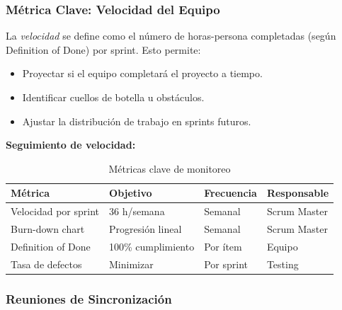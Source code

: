 \documentclass{article}
\begin{document}
\subsubsection{Métrica Clave: Velocidad del Equipo}

La \textit{velocidad} se define como el número de horas-persona completadas (según Definition of Done) por sprint. Esto permite:

\begin{itemize}
    \item Proyectar si el equipo completará el proyecto a tiempo.
    \item Identificar cuellos de botella u obstáculos.
    \item Ajustar la distribución de trabajo en sprints futuros.
\end{itemize}

\textbf{Seguimiento de velocidad:}

\begin{table}[H]
\centering
\small
\begin{tabular}{|p{3.5cm}|p{2.5cm}|p{2cm}|p{2cm}|}
\hline
\textbf{Métrica} & \textbf{Objetivo} & \textbf{Frecuencia} & \textbf{Responsable} \\
\hline
Velocidad por sprint & 36 h/semana & Semanal & Scrum Master \\
\hline
Burn-down chart & Progresión lineal & Semanal & Scrum Master \\
\hline
Definition of Done & 100\% cumplimiento & Por ítem & Equipo \\
\hline
Tasa de defectos & Minimizar & Por sprint & Testing \\
\hline
\end{tabular}
\caption{Métricas clave de monitoreo}
\label{tab:metricas}
\end{table}

\subsubsection{Reuniones de Sincronización}
\end{document}
